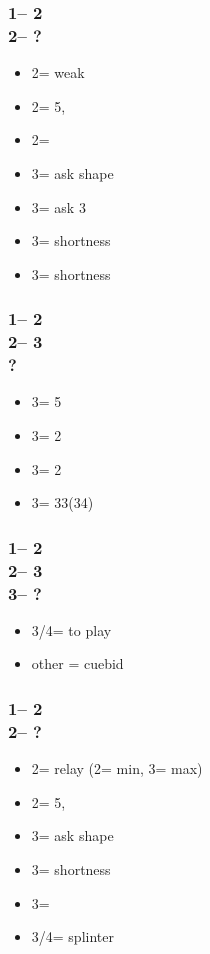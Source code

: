 \documentclass[12pt, a4paper]{report}
\begin{document}
{    \subsubsection*{1\nt -- 2\clubs\\
                    2\diams -- ?}
    \begin{itemize}
        \item 2\hearts = \major weak
        \item 2\spades = 5\spades, \inv
        \item 2\nt = \inv
        \item 3\clubs = ask shape
        \item 3\diams = ask 3\major
        \item 3\hearts = \clubs shortness
        \item 3\spades = \diams shortness
    \end{itemize}

    \subsubsection*{1\nt -- 2\clubs\\
                    2\diams -- 3\clubs\\
                    ?}
    \begin{itemize}
        \item 3\diams = 5\minor \qq
        \item 3\hearts = 2\spades
        \item 3\spades = 2\hearts
        \item 3\nt = 33(34)
    \end{itemize}

    \subsubsection*{1\nt -- 2\clubs\\
                    2\diams -- 3\diams\\
                    3\major -- ?}
    \begin{itemize}
        \item 3\nt/4\major = to play
        \item other = cuebid
    \end{itemize}

    \subsubsection*{1\nt -- 2\clubs\\
                    2\hearts -- ?}
    \begin{itemize}
        \item 2\spades = relay (2\nt = min, 3\clubs = max)
        \item 2\nt = 5\spades, \inv
        \item 3\clubs = ask shape
        \item 3\diams = \minor shortness
        \item 3\hearts = \inv
        \item 3\spades/4\minor = splinter
    \end{itemize}

}
\end{document}
